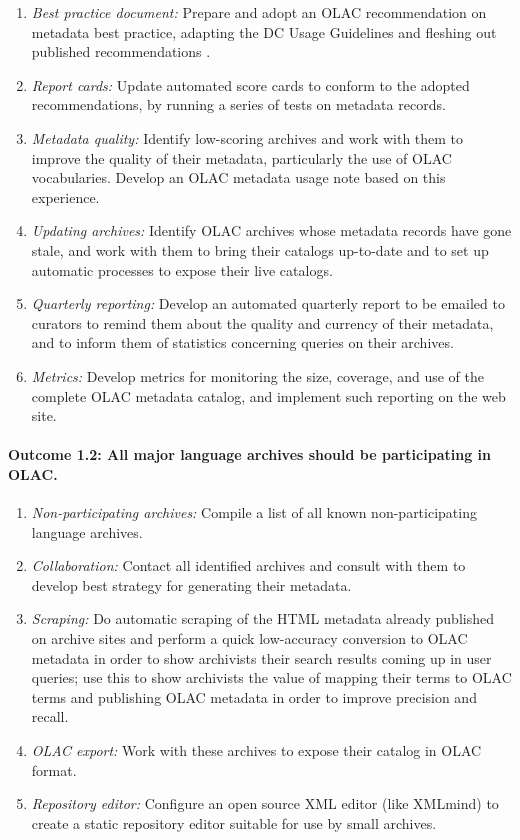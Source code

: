 \begin{enumerate}[label=\emph{\task\alph*}]
\item \emph{Best practice document:}
  Prepare and adopt an OLAC recommendation on metadata best practice,
  adapting the DC Usage Guidelines and fleshing out published recommendations
  \citep{BirdSimons03language,Simons06}.
\item \emph{Report cards:}
  Update automated score cards to conform to the adopted
  recommendations, by running a series of tests on metadata records.
\item \emph{Metadata quality:}
  Identify low-scoring archives and work with them to
  improve the quality of their metadata, particularly the
  use of OLAC vocabularies. 
  Develop an OLAC metadata usage note based on this experience.
\item \emph{Updating archives:}
  Identify OLAC archives whose metadata records have gone stale,
  and work with them to bring their catalogs up-to-date and to
  set up automatic processes to expose their live catalogs.
\item \emph{Quarterly reporting:}
  Develop an automated quarterly report to be emailed to curators to 
  remind them about the quality and currency of their metadata, and to
  inform them of statistics concerning queries on their archives.
\item \emph{Metrics:}
  Develop metrics for monitoring the size, coverage, and use of the 
  complete OLAC metadata catalog, and implement such reporting on the web site.

\end{enumerate}

\def\task{1.2}
\paragraph{Outcome {\task}: All major language archives should be participating in OLAC.}

\begin{enumerate}[label=\emph{\task\alph*}]
\item \emph{Non-participating archives:}
  Compile a list of all known non-participating language archives.
\item \emph{Collaboration:}
  Contact all identified archives and consult with them to develop best
  strategy for generating their metadata.
\item \emph{Scraping:}
  Do automatic scraping of the HTML metadata already published on
  archive sites and perform a quick low-accuracy conversion to OLAC
  metadata in order to show archivists their search results coming up
  in user queries; use this to show archivists the value of mapping their
  terms to OLAC terms and publishing OLAC metadata in order to
  improve precision and recall.
\item \emph{OLAC export:}
  Work with these archives to expose their catalog in OLAC format.
\item \emph{Repository editor:}
  Configure an open source XML editor (like XMLmind) to create a static repository editor
  suitable for use by small archives.
\end{enumerate}

